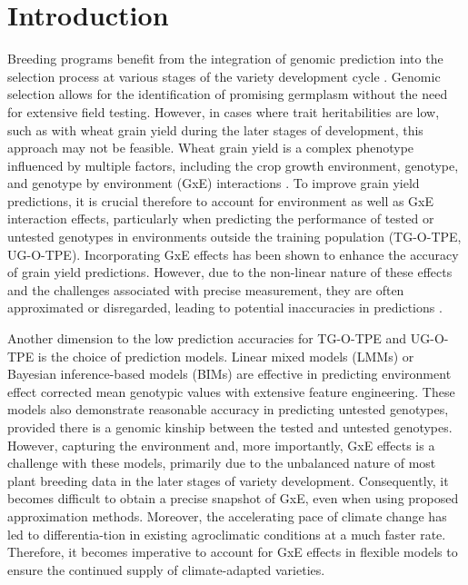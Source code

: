 \documentclass[english, biblatex]{lni}
\begin{document}
\section{Introduction}
Breeding programs benefit from the integration of genomic prediction into the selection process at various stages of the variety development cycle \cite{piepho_blup_2008}. Genomic selection allows for the identification of promising germplasm without the need for extensive field testing. However, in cases where trait heritabilities are low, such as with wheat grain yield during the later stages of development, this approach may not be feasible. Wheat grain yield is a complex phenotype influenced by multiple factors, including the crop growth environment, genotype, and genotype by environment (GxE) interactions \cite{cooper_extending_2023}. To improve grain yield predictions, it is crucial therefore to account for environment as well as GxE interaction effects, particularly when predicting the performance of tested or untested genotypes in environments outside the training population (TG-O-TPE, UG-O-TPE). Incorporating GxE effects has been shown to enhance the accuracy of grain yield predictions. However, due to the non-linear nature of these effects and the challenges associated with precise measurement, they are often approximated \cite{jarquin_reaction_2014} or disregarded, leading to potential inaccuracies in predictions \cite{crossa_genome_2022}.

Another dimension to the low prediction accuracies for TG-O-TPE and UG-O-TPE is the choice of prediction models. Linear mixed models (LMMs) or Bayesian inference-based models (BIMs) are effective in predicting environment effect corrected mean genotypic values with extensive feature engineering. These models also demonstrate reasonable accuracy in predicting untested genotypes, provided there is a genomic kinship between the tested and untested genotypes. However, capturing the environment and, more importantly, GxE effects is a challenge with these models, primarily due to the unbalanced nature of most plant breeding data in the later stages of variety development. Consequently, it becomes difficult to obtain a precise snapshot of GxE, even when using proposed approximation methods. Moreover, the accelerating pace of climate change has led to differentia-tion in existing agroclimatic conditions at a much faster rate. Therefore, it becomes imperative to account for GxE effects in flexible models to ensure the continued supply of climate-adapted varieties. 
\end{document}
